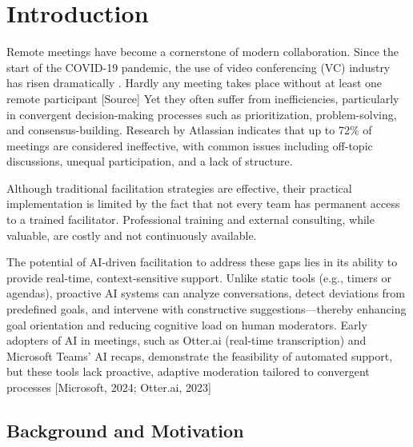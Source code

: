 \chapter{Introduction}
Remote meetings have become a cornerstone of modern collaboration.
Since the start of the COVID-19 pandemic, the use of video conferencing (VC)
industry has risen dramatically \cite{iyengarZoomsRevenueSoars2020}.
Hardly any meeting takes place without at least one remote participant [Source]
Yet they often suffer from inefficiencies,
particularly in convergent decision-making processes such as prioritization, problem-solving, and consensus-building.
Research by Atlassian indicates that up to 72\% of meetings are considered ineffective,
with common issues including off-topic discussions, unequal participation, and a lack of structure.
\cite{atlassianWorkplaceWoesMeetings}

Although traditional facilitation strategies are effective,
their practical implementation is limited by the fact that not every team has permanent access to a trained facilitator.
Professional training and external consulting, while valuable, are costly and not continuously available.

The potential of AI-driven facilitation to address these gaps lies in its ability to provide real-time,
context-sensitive support.
Unlike static tools (e.g., timers or agendas), proactive AI systems can analyze conversations, detect
deviations from predefined goals, and intervene with constructive suggestions—thereby enhancing goal
orientation and reducing cognitive load on human moderators. Early adopters of AI in meetings, such as
Otter.ai (real-time transcription) and Microsoft Teams’ AI recaps, demonstrate the feasibility of automated
support, but these tools lack proactive, adaptive moderation tailored to convergent processes [Microsoft,
2024; Otter.ai, 2023]

\section{Background and Motivation}
